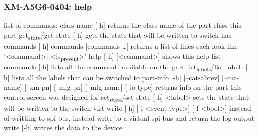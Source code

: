 \documentclass[11pt]{article}
\begin{document}
\subsubsection{XM-A5G6-0404: help}
\label{sec:org67d0ccc}
list of commands:
  class-name [-h]
    returns the class name of the part class this part
  get\textsubscript{state}/get-state [-h]
    gets the state that will be written to switch
  has-commands [-h] commands [commands \ldots{}]
    returns a list of lines each look like '<command>: <is\textsubscript{present}>'
  help [-h] [<command>]
    shows this help
  list-commands [-h]
    lists all the commands available on the part
  list\textsubscript{labels}/list-labels [-h]
    lists all the labels that can be switched to
  part-info  [-h] [--cat-abrev] [--cat-name] [--xm-pn] [--mfg-pn] [--mfg-name]
          [--io-type]
    returns info on the part this control screen was designed for
  set\textsubscript{state}/set-state [-h] <label>
    sets the state that will be written to the switch
  virt-write [-h] [-i <event type>] [-f <bool>]
    instead of writting to spi bus, instead write to a virtual spi bus
    and return the log output
  write [-h]
    writes the data to the device
\end{document}
